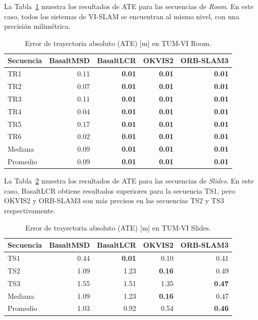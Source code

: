 La Tabla~\ref{tab:room_sota_ate} muestra los resultados de ATE para las secuencias de \textit{Room}. En este caso, todos los sistemas de VI-SLAM se encuentran al mismo nivel, con una precisión milimétrica.
%
\begin{table}[!htbp]
\centering
\caption{Error de trayectoria absoluto (ATE) [m] en TUM-VI Room.}
\label{tab:room_sota_ate}
\begin{tabular}{lrrrr}
\toprule
\textbf{Secuencia} & \textbf{BasaltMSD} & \textbf{BasaltLCR} & \textbf{OKVIS2} & \textbf{ORB-SLAM3} \\
\midrule
TR1 & 0.11 & \textbf{0.01} & \textbf{0.01} & \textbf{0.01} \\
TR2 & 0.07 & \textbf{0.01} & \textbf{0.01} & \textbf{0.01} \\
TR3 & 0.11 & \textbf{0.01} & \textbf{0.01} & \textbf{0.01} \\
TR4 & 0.04 & \textbf{0.01} & \textbf{0.01} & \textbf{0.01} \\
TR5 & 0.17 & \textbf{0.01} & \textbf{0.01} & \textbf{0.01} \\
TR6 & 0.02 & \textbf{0.01} & \textbf{0.01} & \textbf{0.01} \\
\midrule
Mediana & 0.09 & \textbf{0.01} & \textbf{0.01} & \textbf{0.01} \\
Promedio & 0.09 & \textbf{0.01} & \textbf{0.01} & \textbf{0.01} \\
\bottomrule
\end{tabular}
\end{table}

La Tabla~\ref{tab:slides_sota_ate} muestra los resultados de ATE para las secuencias de \textit{Slides}. En este caso, BasaltLCR obtiene resultados superiores para la secuencia TS1, pero OKVIS2 y ORB-SLAM3 son más precisos en las secuencias TS2 y TS3 respectivamente.
%
\begin{table}[!htbp]
\centering
\caption{Error de trayectoria absoluto (ATE) [m] en TUM-VI Slides.}
\label{tab:slides_sota_ate}
\begin{tabular}{lrrrr}
\toprule
\textbf{Secuencia} & \textbf{BasaltMSD} & \textbf{BasaltLCR} & \textbf{OKVIS2} & \textbf{ORB-SLAM3} \\
\midrule
TS1 & 0.44 & \textbf{0.01} & 0.10 & 0.41 \\
TS2 & 1.09 & 1.23 & \textbf{0.16} & 0.49 \\
TS3 & 1.55 & 1.51 & 1.35 & \textbf{0.47} \\
\midrule
Mediana & 1.09 & 1.23 & \textbf{0.16} & 0.47 \\
Promedio & 1.03 & 0.92 & 0.54 & \textbf{0.46} \\
\bottomrule
\end{tabular}
\end{table}

